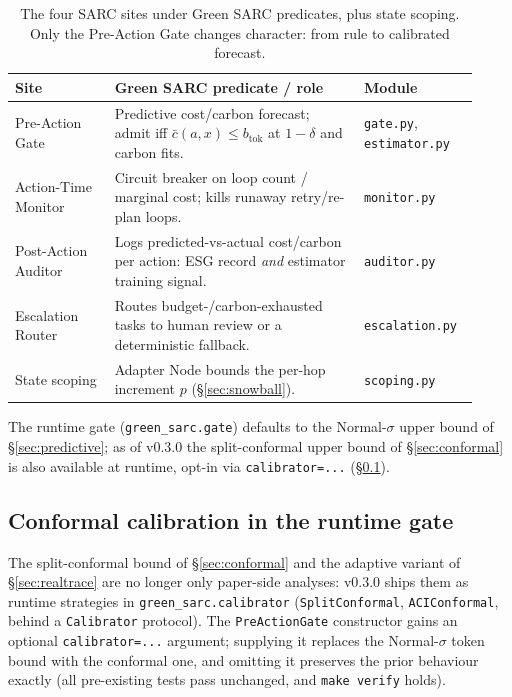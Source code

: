 \documentclass[11pt]{article}
\theoremstyle{plain}
\theoremstyle{definition}
\theoremstyle{remark}
\newcommand{\btok}{b_{\mathrm{tok}}}
\begin{document}
\begin{table}[H]
\centering\small
\begin{tabular}{@{}p{0.20\linewidth} p{0.50\linewidth} p{0.22\linewidth}@{}}
\toprule
\textbf{Site} & \textbf{Green SARC predicate / role} & \textbf{Module} \\
\midrule
Pre-Action Gate & Predictive cost/carbon forecast; admit iff $\bar c(a,x)\le\btok$ at $1-\delta$ and carbon fits. & \texttt{gate.py}, \texttt{estimator.py} \\
Action-Time Monitor & Circuit breaker on loop count / marginal cost; kills runaway retry/re-plan loops. & \texttt{monitor.py} \\
Post-Action Auditor & Logs predicted-vs-actual cost/carbon per action: ESG record \emph{and} estimator training signal. & \texttt{auditor.py} \\
Escalation Router & Routes budget-/carbon-exhausted tasks to human review or a deterministic fallback. & \texttt{escalation.py} \\
State scoping & Adapter Node bounds the per-hop increment $p$ (\S\ref{sec:snowball}). & \texttt{scoping.py} \\
\bottomrule
\end{tabular}
\caption{The four SARC sites under Green SARC predicates, plus state scoping. Only the Pre-Action Gate changes character: from rule to calibrated forecast.}
\label{tab:sites}
\end{table}

The runtime gate (\texttt{green\_sarc.gate}) defaults to the Normal-$\sigma$ upper bound of \S\ref{sec:predictive}; as of v0.3.0 the split-conformal upper bound of \S\ref{sec:conformal} is also available at runtime, opt-in via \texttt{calibrator=...} (\S\ref{sec:runtimeconformal}).

\subsection{Conformal calibration in the runtime gate}\label{sec:runtimeconformal}
The split-conformal bound of \S\ref{sec:conformal} and the adaptive variant of \S\ref{sec:realtrace} are no longer only paper-side analyses: v0.3.0 ships them as runtime strategies in \texttt{green\_sarc.calibrator} (\texttt{SplitConformal}, \texttt{ACIConformal}, behind a \texttt{Calibrator} protocol). The \texttt{PreActionGate} constructor gains an optional \texttt{calibrator=...} argument; supplying it replaces the Normal-$\sigma$ token bound with the conformal one, and omitting it preserves the prior behaviour exactly (all pre-existing tests pass unchanged, and \texttt{make verify} holds).
\end{document}
